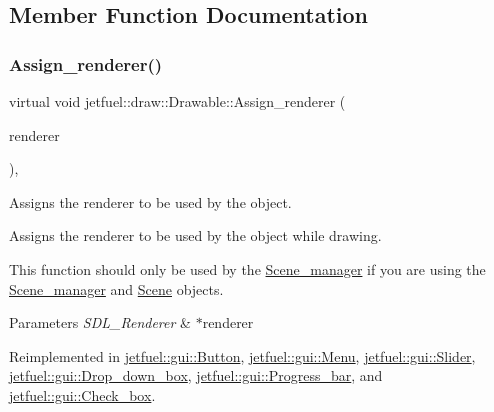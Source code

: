 \subsection{Member Function Documentation}
\mbox{\label{classjetfuel_1_1draw_1_1Drawable_a0d7257f197d6ffcdd89c3a99c93d1400}} 
\subsubsection{\texorpdfstring{Assign\+\_\+renderer()}{Assign\_renderer()}}
{\footnotesize\ttfamily virtual void jetfuel\+::draw\+::\+Drawable\+::\+Assign\+\_\+renderer (\begin{DoxyParamCaption}\item[{S\+D\+L\+\_\+\+Renderer $\ast$}]{renderer }\end{DoxyParamCaption})\hspace{0.3cm}{\ttfamily [inline]}, {\ttfamily [virtual]}}



Assigns the renderer to be used by the object. 

Assigns the renderer to be used by the object while drawing.

This function should only be used by the \hyperlink{classjetfuel_1_1draw_1_1Scene__manager}{Scene\+\_\+manager} if you are using the \hyperlink{classjetfuel_1_1draw_1_1Scene__manager}{Scene\+\_\+manager} and \hyperlink{classjetfuel_1_1draw_1_1Scene}{Scene} objects.


\begin{DoxyParams}{Parameters}
{\em S\+D\+L\+\_\+\+Renderer} & $\ast$renderer \\
\hline
\end{DoxyParams}


Reimplemented in \hyperlink{classjetfuel_1_1gui_1_1Button_aa566a1d59623fde8d062c3d02b6fd5f4}{jetfuel\+::gui\+::\+Button}, \hyperlink{classjetfuel_1_1gui_1_1Menu_acf4a69ccd0ee1490d02fa005c8eba1b4}{jetfuel\+::gui\+::\+Menu}, \hyperlink{classjetfuel_1_1gui_1_1Slider_af9ceba04fec0f7cdc097ea0513094176}{jetfuel\+::gui\+::\+Slider}, \hyperlink{classjetfuel_1_1gui_1_1Drop__down__box_a9160249744bdd278e20a77f470421d3e}{jetfuel\+::gui\+::\+Drop\+\_\+down\+\_\+box}, \hyperlink{classjetfuel_1_1gui_1_1Progress__bar_a34797d42cedf5ff096eafb58c2e76128}{jetfuel\+::gui\+::\+Progress\+\_\+bar}, and \hyperlink{classjetfuel_1_1gui_1_1Check__box_a544261fc2f2d182b73c7ea629fa35e78}{jetfuel\+::gui\+::\+Check\+\_\+box}.


